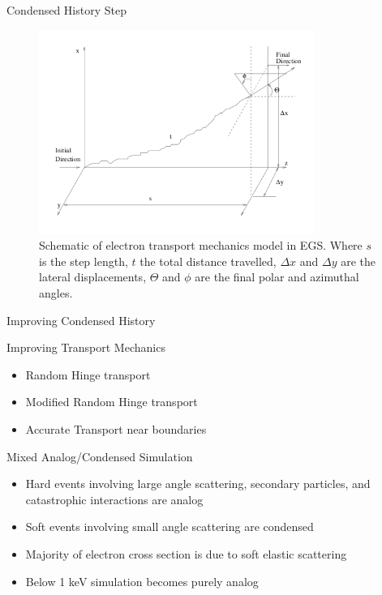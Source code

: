 \documentclass{beamer}
\begin{document}
\begin{frame}{Condensed History Step}
  
\begin{figure}
  \centering
  \includegraphics[width=90mm]{electron_step.png}
  \caption{Schematic of electron transport mechanics model in EGS. Where $s$ is the step length, $t$ the total distance travelled, $\Delta x$ and $\Delta y$ are the lateral displacements, $\Theta$ and $\phi$ are the final polar and azimuthal angles.}
\end{figure}

\end{frame}

\begin{frame}{Improving Condensed History}

\begin{block}{Improving Transport Mechanics}
  
  \begin{itemize}
    \item Random Hinge transport
    \item Modified Random Hinge transport
    \item Accurate Transport near boundaries
  \end{itemize}
  
\end{block}  

\begin{block}{Mixed Analog/Condensed Simulation}
  
  \begin{itemize}
    \item Hard events involving large angle scattering, secondary particles, and catastrophic interactions are analog
    \item Soft events involving small angle scattering are condensed
    \item Majority of electron cross section is due to soft elastic scattering
    \item Below 1 keV simulation becomes purely analog
  \end{itemize}
  
\end{block}  

\end{frame}
\end{document}
